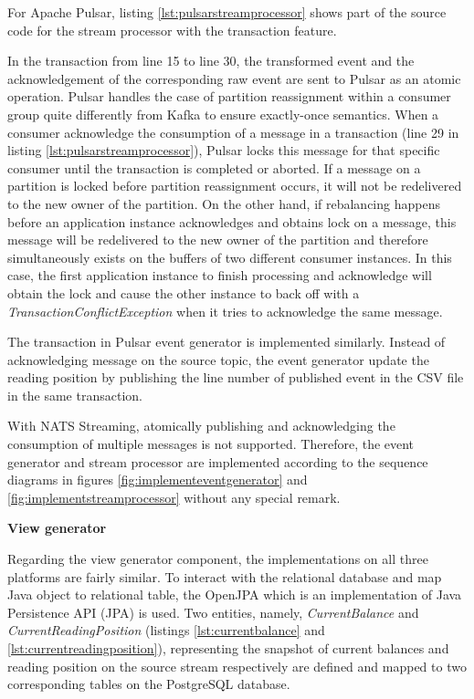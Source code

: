 For Apache Pulsar, listing \ref{lst:pulsarstreamprocessor} shows part of the source code for the stream processor with the transaction feature. 

 

In the transaction from line 15 to line 30, the transformed event and the acknowledgement of the corresponding raw event are sent to Pulsar as an atomic operation. Pulsar handles the case of partition reassignment within a consumer group quite differently from Kafka to ensure exactly-once semantics. When a consumer acknowledge the consumption of a message in a transaction (line 29 in listing \ref{lst:pulsarstreamprocessor}), Pulsar locks this message for that specific consumer \cite{pulsartransaction} until the transaction is completed or aborted. If a message on a partition is locked before partition reassignment occurs, it will not be redelivered to the new owner of the partition. On the other hand, if rebalancing happens before an application instance acknowledges and obtains lock on a message, this message will be redelivered to the new owner of the partition and therefore simultaneously exists on the buffers of two different consumer instances. In this case, the first application instance to finish processing and acknowledge will obtain the lock and cause the other instance to back off with a \emph{TransactionConflictException} when it tries to acknowledge the same message.

The transaction in Pulsar event generator is implemented similarly. Instead of acknowledging message on the source topic, the event generator update the reading position by publishing the line number of published event in the CSV file in the same transaction. 

With NATS Streaming, atomically publishing and acknowledging the consumption of multiple messages is not supported. Therefore, the event generator and stream processor are implemented according to the sequence diagrams in figures \ref{fig:implementeventgenerator} and \ref{fig:implementstreamprocessor} without any special remark.

\textbf{View generator}

Regarding the view generator component, the implementations on all three platforms are fairly similar. To interact with the relational database and map Java object to relational table, the OpenJPA which is an implementation of Java Persistence API (JPA) \cite{jpa} is used. Two entities, namely, \emph{CurrentBalance} and \emph{CurrentReadingPosition} (listings \ref{lst:currentbalance} and \ref{lst:currentreadingposition}), representing the snapshot of current balances and reading position on the source stream respectively are defined and mapped to two corresponding tables on the PostgreSQL database.   

